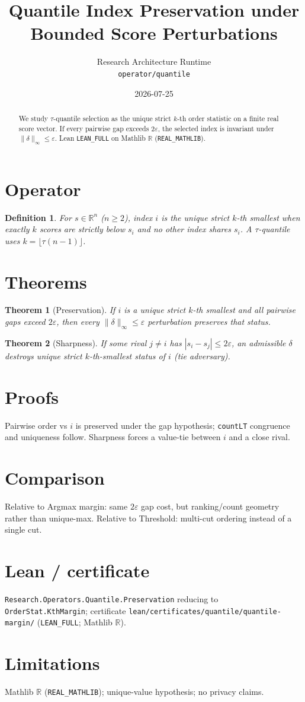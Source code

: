 \documentclass[11pt]{article}
\title{Quantile Index Preservation under Bounded Score Perturbations}
\author{Research Architecture Runtime \\ \texttt{operator/quantile}}
\date{2026-07-25}
\newtheorem{theorem}{Theorem}
\newtheorem{definition}{Definition}
\begin{document}
\maketitle
\begin{abstract}
We study $\tau$-quantile selection as the unique strict $k$-th order statistic on a
finite real score vector. If every pairwise gap exceeds $2\varepsilon$, the selected
index is invariant under $\|\delta\|_\infty\le\varepsilon$. Lean \texttt{LEAN\_FULL}
on Mathlib $\mathbb{R}$ (\texttt{REAL\_MATHLIB}).
\end{abstract}
\section{Operator}
\begin{definition}
For $s\in\mathbb{R}^n$ ($n\ge 2$), index $i$ is the unique strict $k$-th smallest when
exactly $k$ scores are strictly below $s_i$ and no other index shares $s_i$.
A $\tau$-quantile uses $k=\lfloor\tau(n-1)\rfloor$.
\end{definition}
\section{Theorems}
\begin{theorem}[Preservation]
If $i$ is a unique strict $k$-th smallest and all pairwise gaps exceed $2\varepsilon$,
then every $\|\delta\|_\infty\le\varepsilon$ perturbation preserves that status.
\end{theorem}
\begin{theorem}[Sharpness]
If some rival $j\neq i$ has $|s_i-s_j|\le 2\varepsilon$, an admissible $\delta$
destroys unique strict $k$-th-smallest status of $i$ (tie adversary).
\end{theorem}
\section{Proofs}
Pairwise order vs $i$ is preserved under the gap hypothesis; \texttt{countLT} congruence
and uniqueness follow. Sharpness forces a value-tie between $i$ and a close rival.
\section{Comparison}
Relative to Argmax margin: same $2\varepsilon$ gap cost, but ranking/count geometry
rather than unique-max. Relative to Threshold: multi-cut ordering instead of a single cut.
\section{Lean / certificate}
\texttt{Research.Operators.Quantile.Preservation} reducing to
\texttt{OrderStat.KthMargin}; certificate
\texttt{lean/certificates/quantile/quantile-margin/} (\texttt{LEAN\_FULL}; Mathlib $\mathbb{R}$).
\section{Limitations}
Mathlib $\mathbb{R}$ (\texttt{REAL\_MATHLIB}); unique-value hypothesis; no privacy claims.
\end{document}
